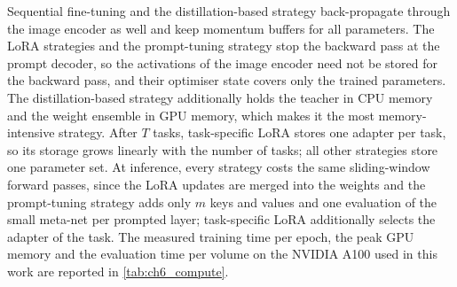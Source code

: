 Sequential fine-tuning and the distillation-based strategy back-propagate through the image encoder as well and keep momentum buffers for all parameters.
The LoRA strategies and the prompt-tuning strategy stop the backward pass at the prompt decoder, so the activations of the image encoder need not be stored for the backward pass, and their optimiser state covers only the trained parameters.
The distillation-based strategy additionally holds the teacher in CPU memory and the weight ensemble in GPU memory, which makes it the most memory-intensive strategy.
After $T$ tasks, task-specific LoRA stores one adapter per task, so its storage grows linearly with the number of tasks; all other strategies store one parameter set.
At inference, every strategy costs the same sliding-window forward passes, since the LoRA updates are merged into the weights and the prompt-tuning strategy adds only $m$ keys and values and one evaluation of the small meta-net per prompted layer; task-specific LoRA additionally selects the adapter of the task.
The measured training time per epoch, the peak GPU memory and the evaluation time per volume on the NVIDIA A100 used in this work are reported in \cref{tab:ch6_compute}.

\begin{table}[tb]
\centering
\caption[Computational cost of the strategies]{Computational cost of the strategies relative to sequential fine-tuning. $P$: parameters of the segmentation model ($440{,}029{,}541$, of which $339{,}292{,}517$ receive gradients, \cref{subsec:method-seqft}); $d$, $L_{\mathrm{dec}}$: dimension and number of prompt-decoder layers; $r$: LoRA rank; $m$, $L_p$: tokens per layer and prompted layers; $|\psi|$: parameters of the meta-net. The frozen text encoder is not counted. Measured runtime and memory: Chapter~6.}
\label{tab:method-complexity}

\end{table}
